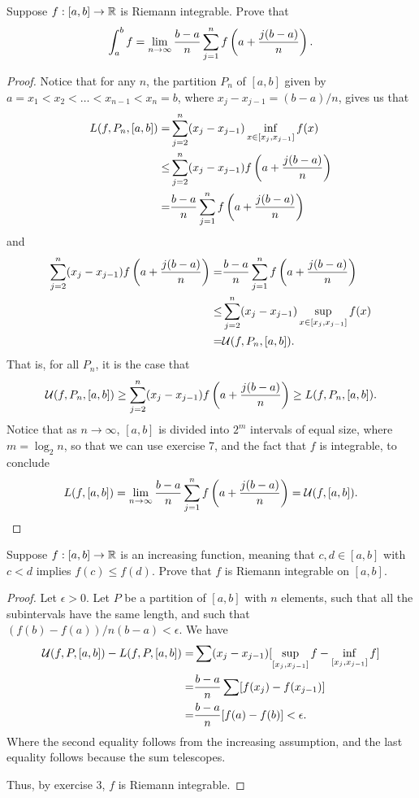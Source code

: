 \begin{exercise}{8}
Suppose $f:[a,b]\to\mathbb{R}$ is Riemann integrable.
Prove that 
\begin{align*}
    \int_a^b f = \lim_{n\to\infty} \frac{b-a}{n}\sum_{j=1}^n f\left( a+\frac{j(b-a)}{n}\right).
\end{align*}
\end{exercise}
\begin{proof}
Notice that for any $n$, the partition $P_n$ of $[a,b]$ given by $a=x_1<x_2<\dots<x_{n-1}<x_n=b$, where $x_j-x_{j-1} = (b-a)/n$, gives us that
\begin{align*}
    L(f, P_n, [a,b]) 
    =& \sum_{j=2}^n (x_j-x_{j-1}) \inf_{x\in[x_j,x_{j-1}]}f(x)\\
    \leq& \sum_{j=2}^n (x_j-x_{j-1}) f\left( a+\frac{j(b-a)}{n}\right)\\
    =& \frac{b-a}{n}\sum_{j=1}^n f\left( a+\frac{j(b-a)}{n}\right) 
\end{align*}
and
\begin{align*}
    \sum_{j=2}^n (x_j-x_{j-1}) f\left( a+\frac{j(b-a)}{n}\right)
    =& \frac{b-a}{n}\sum_{j=1}^n f\left( a+\frac{j(b-a)}{n}\right)\\
    \leq& \sum_{j=2}^n (x_j-x_{j-1}) \sup_{x\in[x_j,x_{j-1}]}f(x)\\
    =& \mathcal{U}(f,P_n,[a,b]).
\end{align*}
That is, for all $P_n$, it is the case that
\begin{align*}
    \mathcal{U}(f,P_n,[a,b]) 
    \geq \sum_{j=2}^n (x_j-x_{j-1}) f\left( a+\frac{j(b-a)}{n}\right)
    \geq L(f,P_n,[a,b]).
\end{align*}
Notice that as $n\to\infty$, $[a,b]$ is divided into $2^m$ intervals of equal size, where $m = \log_2 n$, so that we can use exercise 7, and the fact that $f$ is integrable, to conclude
\begin{align*}
    L(f, [a,b]) = \lim_{n\to\infty} \frac{b-a}{n}\sum_{j=1}^n f\left( a+\frac{j(b-a)}{n}\right) = \mathcal{U}(f,[a,b]).
\end{align*}
\end{proof} 

\begin{exercise}{13}
Suppose $f:[a,b]\to\mathbb{R}$ is an increasing function, meaning that $c,d\in [a,b]$ with $c<d$ implies $f(c)\leq f(d)$.
Prove that $f$ is Riemann integrable on $[a,b]$.
\end{exercise}
\begin{proof}
Let $\epsilon>0$.
Let $P$ be a partition of $[a,b]$ with $n$ elements, such that all the subintervals have the same length, and such that $(f(b)-f(a))/n(b-a)< \epsilon$.
We have
\begin{align*}
    \mathcal{U}(f,P,[a,b]) - L(f,P,[a,b])
    =& \sum (x_j - x_{j-1})[\sup_{[x_j, x_{j-1}]} f - \inf_{[x_j, x_{j-1}]} f]\\
    =& \frac{b-a}{n} \sum [f(x_j) - f(x_{j-1})]\\
    =& \frac{b-a}{n} [f(a) - f(b)] < \epsilon.
\end{align*}
Where the second equality follows from the increasing assumption, and the last equality follows because the sum telescopes.

Thus, by exercise 3, $f$ is Riemann integrable.
\end{proof} 

